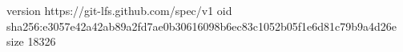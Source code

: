 version https://git-lfs.github.com/spec/v1
oid sha256:e3057e42a42ab89a2fd7ae0b30616098b6ec83c1052b05f1e6d81c79b9a4d26e
size 18326
